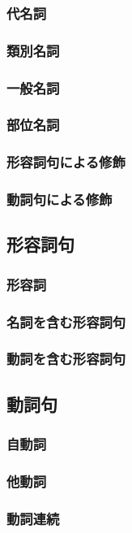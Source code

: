 \subsubsection{代名詞}
\subsubsection{類別名詞}
\subsubsection{一般名詞}
\subsubsection{部位名詞}
\subsubsection{形容詞句による修飾}
\subsubsection{動詞句による修飾}
\subsection{形容詞句}
\subsubsection{形容詞}
\subsubsection{名詞を含む形容詞句}
\subsubsection{動詞を含む形容詞句}
\subsection{動詞句}
\subsubsection{自動詞}
\subsubsection{他動詞}
\subsubsection{動詞連続}
\newpage

